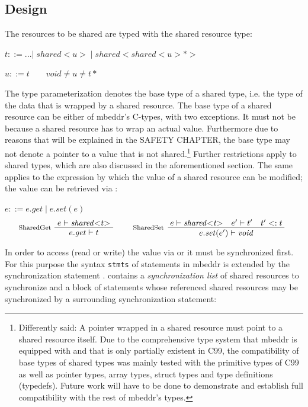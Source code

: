 \subsection{Design}
The resources to be shared are typed with the shared resource type:

$ t ::= ...|\;\mathit{shared{<}u{>}}\;|\;\mathit{shared{<}shared{<}u{>}{*}{>}}\;$

$ u ::= t \qquad \textit{void} \neq u \neq t*$

The type parameterization denotes the base type of a shared type, i.e. the type of the data that is wrapped by a shared resource. The base type of a shared resource can be either of mbeddr's C-types, with two exceptions. It must not be  because a shared resource has to wrap an actual value. Furthermore due to reasons that will be explained in the SAFETY CHAPTER, the base type may not denote a pointer to a value that is not shared.\footnote{Differently said: A pointer wrapped in a shared resource must point to a shared resource itself. Due to the comprehensive type system that mbeddr is equipped with and that is only partially existent in C99, the compatibility of base types of shared types was mainly tested with the primitive types of C99 as well as pointer types, array types, struct types and type definitions (typedefs). Future work will have to be done to demonstrate and establish full compatibility with the rest of mbeddr's types.} Further restrictions apply to shared types, which are also discussed in the aforementioned section. The same applies to the  expression by which the value of a shared resource can be modified; the value can be retrieved via :

$ e ::= e.\mathit{get}\;|\;e.\mathit{set(e)} $
\begin{align*}
\inference*[SharedGet]{e |- \mathit{shared{<}t{>}}} {\quad e.\mathit{get} |- t \quad}
\qquad
\inference*[SharedSet]{e |- \mathit{shared{<}t{>}} \quad e' |- t' \quad t' <: t} {\qquad\quad e.\mathit{set}(e') |- \mathit{void} \quad\qquad} 
\end{align*}

In order to access (read or write) the value via  or  it must be synchronized first. For this purpose the syntax \texttt{stmts} of statements in mbeddr is extended by the synchronization statement .  contains a \textit{synchronization list} of shared resources to synchronize and a block of statements whose referenced shared resources may be synchronized by a surrounding synchronization statement:

